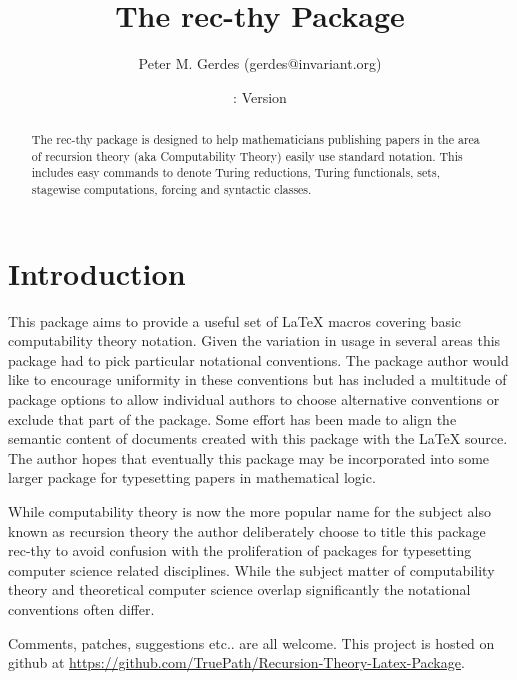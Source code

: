 \documentclass[leqno,11pt]{amsart}
\title{The rec-thy Package}
\author{Peter M. Gerdes (gerdes@invariant.org)}
\date{\DateOfPackage{rec-thy}: Version \recthyVersion}
\begin{document}
\begin{abstract}
\noindent The rec-thy package is designed to help mathematicians publishing papers in the area of recursion theory (aka Computability Theory) easily use standard notation.  This includes easy commands to denote Turing reductions, Turing functionals, \ce sets, stagewise computations, forcing and syntactic classes.
\end{abstract}



\maketitle




\section{Introduction}
This package aims to provide a useful set of \LaTeX { }macros covering basic computability theory notation.  Given the variation in usage in several areas this package had to pick particular notational conventions.  The package author would like to encourage uniformity in these conventions but has included a multitude of package options to allow individual authors to choose alternative conventions or exclude that part of the package.  Some effort has been made to align the semantic content of documents created with this package with the \LaTeX { }source.  The author hopes that eventually this package may be incorporated into some larger package for typesetting papers in mathematical logic.

While computability theory is now the more popular name for the subject also known as recursion theory the author deliberately choose to title this package rec-thy to avoid confusion with the proliferation of packages for typesetting computer science related disciplines.  While the subject matter of computability theory and theoretical computer science overlap significantly the notational conventions often differ.

Comments, patches, suggestions etc.. are all welcome.  This project is hosted on github at \href{https://github.com/TruePath/Recursion-Theory-Latex-Package}{https://github.com/TruePath/Recursion-Theory-Latex-Package}.
\end{document}
